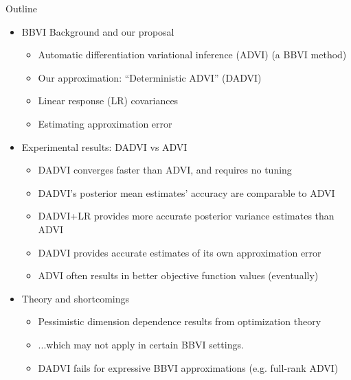 \documentclass[8pt]{beamer}\usepackage[]{graphicx}\usepackage[]{color}
\begin{document}

\begin{frame}{Outline}
%
\begin{itemize}
    \item BBVI Background and our proposal
    \begin{itemize}
        \item Automatic differentiation variational inference (ADVI) (a BBVI method)
        \item Our approximation: ``Deterministic ADVI'' (DADVI)
        \item Linear response (LR) covariances
        \item Estimating approximation error
    \end{itemize}
    \item Experimental results: DADVI vs ADVI
    \begin{itemize}
        \item DADVI converges faster than ADVI, and requires no tuning
        \item DADVI's posterior mean estimates' accuracy are comparable to ADVI
        \item DADVI+LR provides more accurate posterior variance estimates than ADVI
        \item DADVI provides accurate estimates of its own approximation error
        \item ADVI often results in better objective function values (eventually)
    \end{itemize}
    \item Theory and shortcomings
    \begin{itemize}
        \item Pessimistic dimension dependence results from optimization theory
        \item ...which may not apply in certain BBVI settings.
        \item DADVI fails for expressive BBVI approximations (e.g. full-rank ADVI)
    \end{itemize}
\end{itemize}
%
\end{frame}

\end{document}
